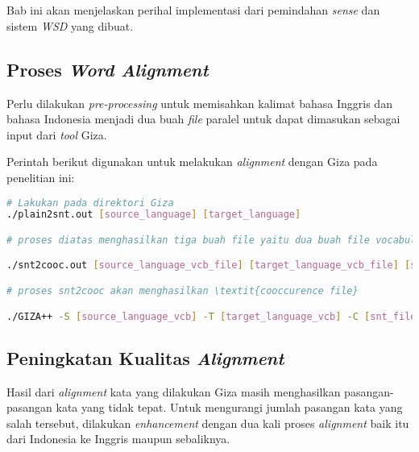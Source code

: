 \chapter{\babEmpat} \label{implementasi}
Bab ini akan menjelaskan perihal implementasi dari pemindahan \textit{sense} dan sistem \textit{WSD} yang dibuat.

\section{Proses \textit{Word Alignment}}
Perlu dilakukan \textit{pre-processing} untuk memisahkan kalimat bahasa Inggris dan bahasa Indonesia menjadi dua buah \textit{file} paralel untuk dapat dimasukan sebagai input dari \textit{tool} Giza.

Perintah berikut digunakan untuk melakukan \textit{alignment} dengan Giza pada penelitian ini:

\begin{lstlisting}[language=bash,caption={Word Alignment}, label={word-alignment}]
# Lakukan pada direktori Giza
./plain2snt.out [source_language] [target_language]

# proses diatas menghasilkan tiga buah file yaitu dua buah file vocabulary yang berisi indeks dengan kata (bahasa asal, dan bahasa tujuan), dan satu buah file snt yang berisi \textit{alignment} dari kalimat.

./snt2cooc.out [source_language_vcb_file] [target_language_vcb_file] [snt_file] > [coocurrence_file]

# proses snt2cooc akan menghasilkan \textit{cooccurence file}

./GIZA++ -S [source_language_vcb] -T [target_language_vcb] -C [snt_file] -CoocurrenceFile [cooc_file]
\end{lstlisting}

	

\section{Peningkatan Kualitas \textit{Alignment}}

Hasil dari \textit{alignment} kata yang dilakukan Giza masih menghasilkan pasangan-pasangan kata yang tidak tepat. Untuk mengurangi jumlah pasangan kata yang salah tersebut, dilakukan \textit{enhancement} dengan dua kali proses \textit{alignment} baik itu dari Indonesia ke Inggris maupun sebaliknya.

